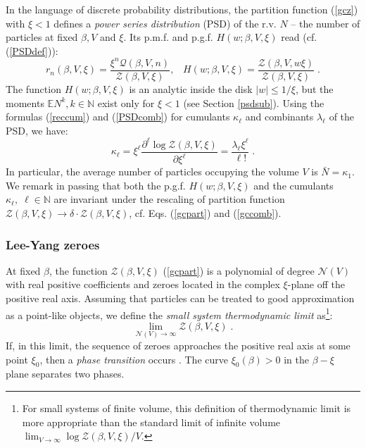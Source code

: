 \documentclass[a4paper,12pt]{amsart}
\newcommand{\E}{\mathbb{E}}
\newcommand{\N}{\mathbb{N}}
\theoremstyle{definition}
\theoremstyle{remark}
\begin{document}
In the language of discrete probability distributions, the partition function (\ref{gcz}) with $\xi<1$ defines a {\it power series distribution} (PSD) of the r.v. $N$ -- the number of particles at fixed  $\beta, V$ and $\xi$. Its p.m.f. and p.g.f.{} $H(w;\beta,V,\xi)$ read (cf. (\ref{PSDdef})):
\begin{equation} \label{gcpart} 
 r_n(\beta, V, \xi)\!=\!\frac{\xi^n \mathcal{Q}(\beta,V,n)}{\mathcal{Z}(\beta,V,\xi)},\;\;\;H(w;\beta, V,\xi)= 
     \frac{\mathcal{Z}(\beta, V, w\xi)}{\mathcal{Z}(\beta, V, \xi)}\;.
\end{equation}
The function $H(w;\beta,V,\xi)$ is an analytic inside the disk $|w|\leq 1/\xi$, but the moments $\E N^k, k\in \N$ exist only for $\xi<1$ (see Section \ref{psdsub}). Using the formulas (\ref{reccum}) and (\ref{PSDcomb}) for cumulants $\kappa_{\ell}$ and combinants $\lambda_{\ell}$ of the PSD, we have:
\begin{equation}\label{gccomb}
\kappa_{\ell}=\xi^{\ell}\frac{\partial^{\ell}\log\mathcal{Z}(\beta, V, \xi)}{\partial\xi^{\ell}}=\frac{\lambda_{\ell}\xi^{\ell}}{\ell!}\;.
\end{equation}
In particular, the average number of particles occupying the volume $V$ is $\bar{N}=\kappa_1$. We remark in passing that both the p.g.f. $H(w;\beta,V,\xi)$  and the cumulants $\kappa_{\ell},\;\ell\in \N$  are invariant under the rescaling of partition function $\mathcal{Z}(\beta, V, \xi)\to \delta \cdot \mathcal{Z}(\beta, V, \xi)$, cf. Eqs. (\ref{gcpart}) and (\ref{gccomb}). 

\subsubsection{Lee-Yang zeroes}
At fixed $\beta$, the function $\mathcal{Z}(\beta, V,\xi)$ (\ref{gcpart}) is a polynomial of degree $\mathcal{N}(V)$ with real positive coefficients and zeroes located in the complex $\xi$-plane off the positive real axis. Assuming that particles can be treated to good approximation as a point-like objects, we define the {\it small system thermodynamic limit} as\footnote{For small systems of finite volume, this definition of thermodynamic limit is more appropriate \cite{Hagedorn:1985js} than the standard limit of infinite volume $\lim_{V\to\infty} \log \mathcal{Z}(\beta, V,\xi)/V
$.}:
\begin{equation}\label{thlim}
\lim_{\mathcal{N}(V)\to\infty}\mathcal{Z}(\beta, V,\xi)\;.
\end{equation}
If, in this limit, the sequence of zeroes approaches the positive real axis at some point $\xi_0$, then a {\it phase transition} occurs  \cite{Yang:1952be}. The curve $\xi_0(\beta)>0$ in the $\beta-\xi$ plane separates two phases. 
\end{document}
